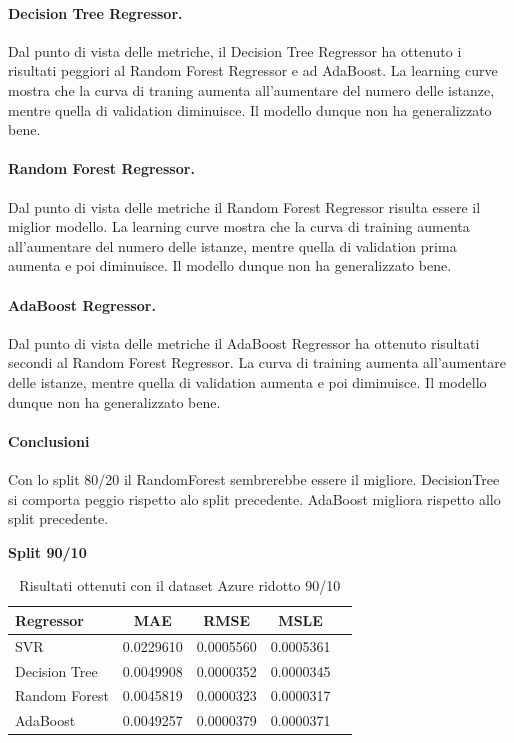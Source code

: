 \paragraph{\textbf{Decision Tree Regressor}.}
Dal punto di vista delle metriche, il Decision Tree Regressor ha ottenuto i risultati peggiori al Random Forest Regressor e ad AdaBoost.
La learning curve mostra che la curva di traning aumenta all'aumentare del numero delle istanze, mentre quella di validation diminuisce. Il modello dunque non ha generalizzato bene.
\paragraph{\textbf{Random Forest Regressor}.}
Dal punto di vista delle metriche il Random Forest Regressor risulta essere il miglior modello.
La learning curve mostra che la curva di training aumenta all'aumentare del numero delle istanze, mentre quella di validation prima aumenta e poi diminuisce. Il modello dunque non ha generalizzato bene.
\paragraph{\textbf{AdaBoost Regressor}.}
Dal punto di vista delle metriche il AdaBoost Regressor ha ottenuto risultati secondi al Random Forest Regressor. La curva di training aumenta all'aumentare delle istanze, mentre quella di validation aumenta e poi diminuisce. Il modello dunque non ha generalizzato bene.

\paragraph{\textbf{Conclusioni}} Con lo split 80/20 il RandomForest sembrerebbe essere il migliore. DecisionTree si comporta peggio rispetto alo split precedente. AdaBoost migliora rispetto allo split precedente.

\newpage

\noindent\textbf{Split 90/10}

\begin{table}[H]
    \centering
    \begin{tabular}{|>{\centering\arraybackslash}m{5cm}|c|c|c|c|}
        \hline
        \textbf{Regressor} & \textbf{MAE} & \textbf{RMSE} & \textbf{MSLE} \\ [10pt]
        \hline
        SVR & 0.0229610 & 0.0005560 & 0.0005361 \\ [10pt]
        \hline
        Decision Tree & 0.0049908 & 0.0000352 & 0.0000345 \\ [10pt]
        \hline
        Random Forest & 0.0045819 & 0.0000323 & 0.0000317 \\ [10pt]
        \hline
        AdaBoost & 0.0049257 & 0.0000379 & 0.0000371 \\ [10pt]
        \hline
    \end{tabular}
    \caption{Risultati ottenuti con il dataset Azure ridotto 90/10}
    \label{tab:results}
\end{table}


